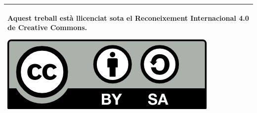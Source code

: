 \chapter*{}
\thispagestyle{empty}

 \begin{tabular}{|p{}|}
 \hline
 Aquest treball està llicenciat sota el Reconeixement Internacional 4.0 de Creative Commons.
 \begin{center}
 \includegraphics[scale=1]{img/cc-by-sa.png}
 \end{center}\\
 \hline
 \end{tabular}